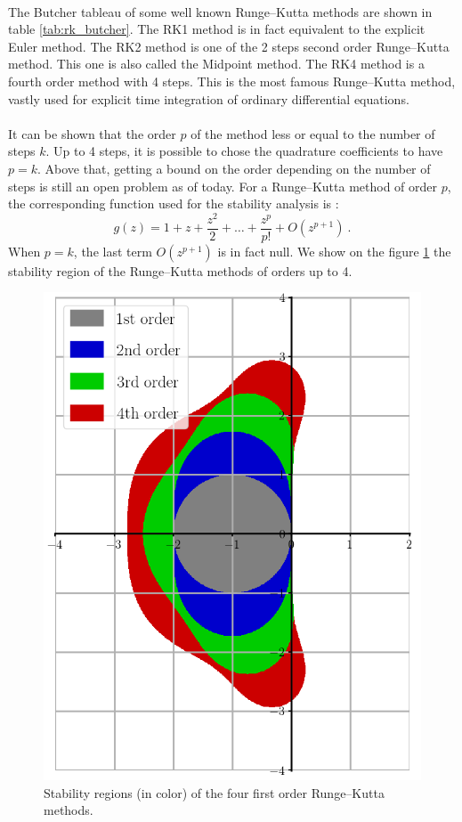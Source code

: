         \paragraph{}
        The Butcher tableau of some well known Runge--Kutta methods are shown in table \ref{tab:rk_butcher}.
        The RK1 method is in fact equivalent to the explicit Euler method.
        The RK2 method is one of the 2 steps second order Runge--Kutta method.
        This one is also called the Midpoint method.
        The RK4 method is a fourth order method with 4 steps.
        This is the most famous Runge--Kutta method, vastly used for explicit time integration of ordinary differential equations.

        \paragraph{}
        It can be shown that the order $p$ of the method less or equal to the number of steps $k$.
        Up to 4 steps, it is possible to chose the quadrature coefficients to have $p = k$.
        Above that, getting a bound on the order depending on the number of steps is still an open problem as of today.
        For a Runge--Kutta method of order $p$, the corresponding function used for the stability analysis is \cite{HairerWanner1996}:
        \begin{equation}
          g\left(z\right) = 1 + z + \frac{z^2}{2} + \dots + \frac{z^p}{p!} + O\left(z^{p+1}\right) \ .
        \end{equation}
        When $p = k$, the last term $O\left(z^{p+1}\right)$ is in fact null.
        We show on the figure \ref{fig:rk_stab} the stability region of the Runge--Kutta methods of orders up to 4.

        \begin{figure}
          \centering
          \includegraphics[width=.45\textwidth]{figures/rk_stab.png}
          \caption{Stability regions (in color) of the four first order Runge--Kutta methods.}
          \label{fig:rk_stab}
        \end{figure}

